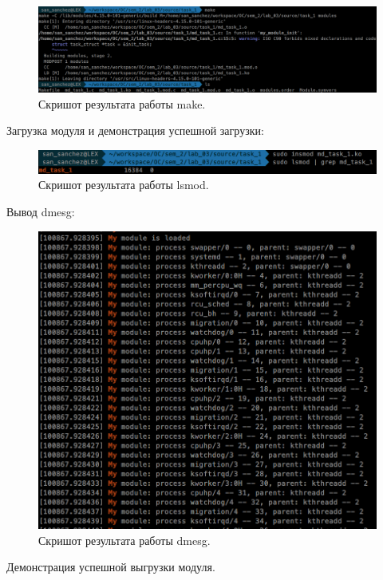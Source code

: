 \begin{figure}[H]
    \centering
    \includegraphics[scale=0.34]{data/image/task_1_new.png}
    \caption{Скришот результата работы make.}
\end{figure}

Загрузка модуля и демонстрация успешной загрузки:

\begin{figure}[H]
    \centering
    \includegraphics[scale=0.45]{data/image/task_1_2.png}
    \caption{Скришот результата работы lsmod.}
\end{figure}

Вывод dmesg:

\begin{figure}[H]
    \centering
    \includegraphics[scale=0.5]{data/image/task_1_3.png}
    \caption{Скришот результата работы dmesg.}
\end{figure}

Демонстрация успешной выгрузки модуля.

